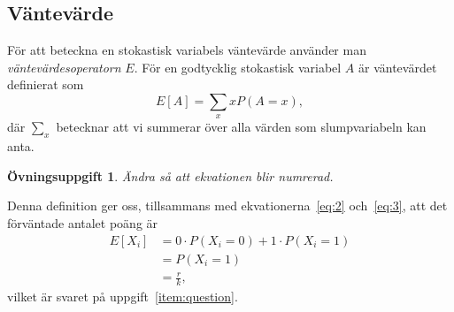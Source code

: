 \documentclass[12pt,a4wide]{article}
\theoremstyle{uppgiftsstil}
\newcommand{\ovningstext}{Övningsuppgift}
\newtheorem{ovning}{\ovningstext}
\newenvironment{uppgift}{\begin{framed}\begin{ovning}}%
                        {\end{ovning}\end{framed}}
\theoremstyle{avklaradstil}
\begin{document}
\subsection{Väntevärde}

För att beteckna en stokastisk variabels väntevärde använder man
\emph{vänte\-värdes\-operatorn} $E$. 
För en godtycklig stokastisk variabel $A$ är väntevärdet definierat
som
%
\begin{equation*}           %
  E[A] = \sum_x xP(A = x),  %
\end{equation*}
%
där $\sum_x$ betecknar att vi summerar över alla värden som
slumpvariabeln kan anta. 
%
\begin{uppgift}
  Ändra så att ekvationen blir numrerad.
\end{uppgift}
%
Denna definition ger oss, tillsammans med ekvationerna~\ref{eq:2}
och~\ref{eq:3},   
att det förväntade antalet poäng är 
%
\begin{align} %
  E[X_i] &= 0 \cdot P(X_i = 0) + 1 \cdot P(X_i = 1) \nonumber \\ %
         &= P(X_i = 1)                              \nonumber \\ %
         &= \boxed{\frac{r}{k}}, \label{eq:oneq}  %
\end{align}
%
vilket är svaret på uppgift~\ref{item:question}. 
\end{document}
